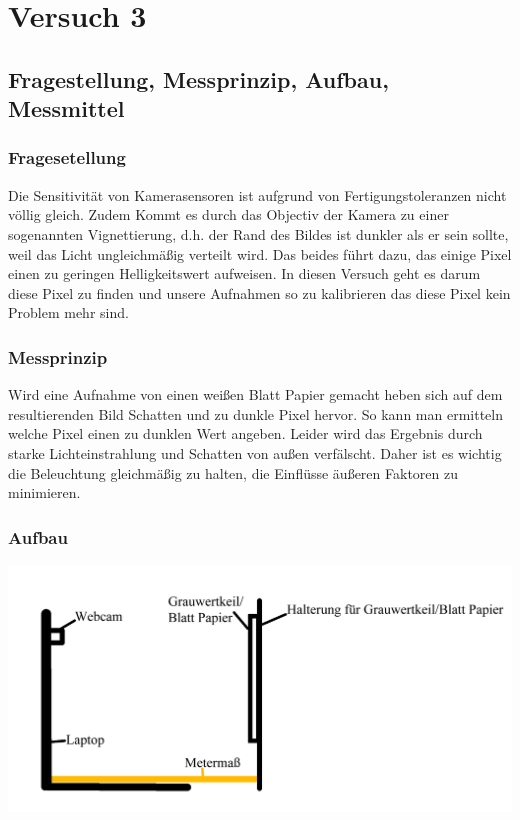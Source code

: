 \chapter{Versuch 3}
\label{chap:VERSUCH_3}

\section{Fragestellung, Messprinzip, Aufbau, Messmittel}
\label{chap:VERSUCH_3_FRAGESTELLUNG}

\subsection*{Fragesetellung}

Die Sensitivität von Kamerasensoren ist aufgrund von Fertigungstoleranzen nicht völlig gleich.
Zudem Kommt es durch das Objectiv der Kamera zu einer sogenannten Vignettierung, d.h. der Rand des Bildes ist dunkler als er sein sollte, weil das Licht ungleichmäßig verteilt wird.
Das beides führt dazu, das einige Pixel einen zu geringen Helligkeitswert aufweisen.
In diesen Versuch geht es darum diese Pixel zu finden und unsere Aufnahmen so zu kalibrieren das diese Pixel kein Problem mehr sind.

\subsection*{Messprinzip}
Wird eine Aufnahme von einen weißen Blatt Papier gemacht heben sich auf dem resultierenden Bild Schatten und zu dunkle Pixel hervor.
So kann man ermitteln welche Pixel einen zu dunklen Wert angeben.
Leider wird das Ergebnis durch starke Lichteinstrahlung und Schatten von außen verfälscht.
Daher ist es wichtig die Beleuchtung gleichmäßig zu halten, die Einflüsse äußeren Faktoren zu minimieren.

\subsection*{Aufbau}

\includegraphics[scale=0.4]{media/Versuchsaufbau_2.png}

